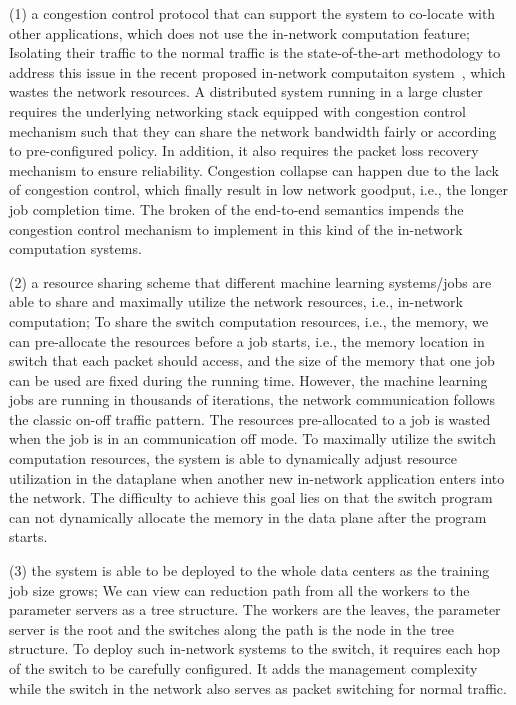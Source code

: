 (1) a congestion control protocol that can support the system to
co-locate with other applications, which does not use the in-network computation feature;
Isolating their traffic to the normal traffic is the state-of-the-art methodology to 
address this issue in the recent proposed in-network computaiton system~\cite{netcache, netchain, harmonia, switchml}, which wastes the network resources. 
A distributed system running in a large cluster requires the underlying networking stack equipped with 
congestion control mechanism such that they can share the network
bandwidth fairly or according to pre-configured policy.
In addition, it also requires the packet loss recovery mechanism to ensure 
reliability. Congestion collapse can happen due to the lack of congestion control, 
which finally result in low network goodput, i.e., the longer job completion time. 
The broken of the end-to-end semantics impends the congestion control mechanism to implement
in this kind of the in-network computation systems. 


(2) a resource sharing scheme that different machine learning systems/jobs
are able to share and maximally utilize the network resources, i.e., in-network computation;
To share the switch computation resources, i.e., the memory, we can pre-allocate 
the resources before a job starts, i.e., 
the memory location in switch that each packet should access, and the
size of the memory that one job can be used are fixed during the running time.
However, the machine learning jobs are running in thousands of iterations, 
the network communication
follows the classic on-off traffic pattern. The resources pre-allocated to 
a job is wasted when the job is in an communication off mode.
To maximally utilize the switch computation resources, 
the system is able to dynamically adjust resource utilization in
the dataplane when another new in-network application enters into the network.
The difficulty to achieve this goal lies on that the switch program can not dynamically 
allocate the memory in the data plane after the program starts.

(3) the system is able to be deployed to the whole data centers as
the training job size grows;
We can view can reduction path from all the workers to the parameter servers as a tree structure.
The workers are the leaves, the parameter server is the root and the switches along the path 
is the node in the tree structure.
To deploy such in-network systems to the switch, it requires each hop of the switch 
to be carefully configured.
It adds the management complexity while the switch 
in the network also serves as packet switching for normal traffic.



